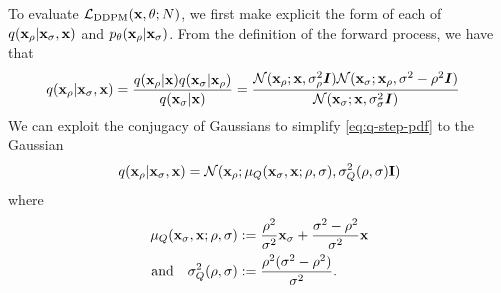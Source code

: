 To evaluate ${\mathcal{L}}_\text{DDPM}({\mathbf{x}}, \theta; N)$, we first make explicit the form of each of $q({\mathbf{x}}_{\rho} | {\mathbf{x}}_{\sigma}, {\mathbf{x}})$ and $p_\theta({\mathbf{x}}_{\rho} | {\mathbf{x}}_{\sigma})$. From the definition of the forward process, we have that
\begin{align} \label{eq:q-step-pdf}
    q({\mathbf{x}}_{\rho} | {\mathbf{x}}_{\sigma}, {\mathbf{x}}) &= \frac{q({\mathbf{x}}_{\rho} | {\mathbf{x}}) q({\mathbf{x}}_{\sigma} | {\mathbf{x}}_{\rho})}{q({\mathbf{x}}_{\sigma}|{\mathbf{x}})} = \frac{{\mathcal{N}}({\mathbf{x}}_{\rho}; {\mathbf{x}}, \sigma_{\rho}^2 {\bm{I}}) {\mathcal{N}}({\mathbf{x}}_{\sigma}; {\mathbf{x}}_{\rho}, \sigma^2-\rho^2 {\bm{I}}) }{{\mathcal{N}}({\mathbf{x}}_{\sigma}; {\mathbf{x}}, \sigma_{\sigma}^2 {\bm{I}})}
\end{align}
We can exploit the conjugacy of Gaussians to simplify \cref{eq:q-step-pdf} to the Gaussian
\begin{align}
    q({\mathbf{x}}_\rho|{\mathbf{x}}_\sigma,{\mathbf{x}}) = {\mathcal{N}}( {\mathbf{x}}_\rho; \mathbf{\mu}_Q({\mathbf{x}}_\sigma, {\mathbf{x}}; \rho, \sigma), \sigma_Q^2(\rho, \sigma) \mathbf{I})
\end{align}
where
\begin{align} \label{eq:mu-q}
    \mathbf{\mu}_Q({\mathbf{x}}_\sigma, {\mathbf{x}}; \rho, \sigma) &:= \frac{\rho^2}{\sigma^2} {\mathbf{x}}_\sigma + \frac{\sigma^2-\rho^2}{\sigma^2} {\mathbf{x}} \\
    \label{eq:sigma-q}
    \text{and}\quad 
    \sigma_Q^2(\rho, \sigma) &:= \frac{\rho^2 (\sigma^2-\rho^2)}{\sigma^2}.
\end{align}

